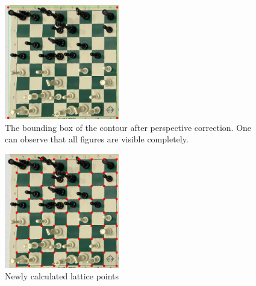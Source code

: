 \documentclass[conference]{IEEEtran}
\begin{document}
\begin{figure}[bt]
    \centering
    \includegraphics[width=5cm]{Figures/Reprojected image with contour bounding box.png}
    \caption{The bounding box of the contour after perspective correction. One can observe that all figures are visible completely.}
    \label{fig:img-reprojected-margin}
\end{figure}


\begin{figure}[bt] 
    \centering
    \includegraphics[width=5cm]{Figures/Reprojected image with all lattice points.png}
    \caption{Newly calculated lattice points}
    \label{fig:img-reprojected-all}
\end{figure}
\end{document}
